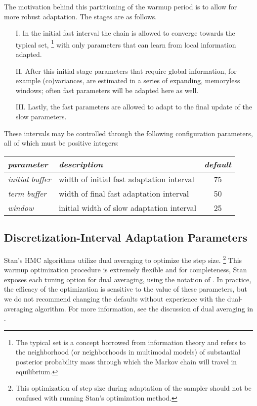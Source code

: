 The motivation behind this partitioning of the warmup period is to
allow for more robust adaptation.  The stages are as follows.

\begin{enumerate}
\item[I.]
In the initial fast interval the chain is allowed to converge
towards the typical set,%
%
\footnote{The typical set is a concept borrowed from information
  theory and refers to the neighborhood (or neighborhoods in
  multimodal models) of substantial posterior probability mass through
  which the Markov chain will travel in equilibrium.}
%
with only parameters that can learn from local information adapted.
\item[II.]
After this initial stage parameters that require global
information, for example (co)variances, are estimated in a series of
expanding, memoryless windows; often fast parameters will be adapted
here as well. 
\item[III.]
Lastly, the fast parameters are allowed to adapt to the
final update of the slow parameters.
\end{enumerate}

These intervals may be controlled through the following
configuration parameters, all of which must be positive integers:
%
\begin{center}
\begin{tabular}{l|lc}
{\it parameter} & {\it description} & {\it default} 
\\ \hline
{\it initial buffer} & width of initial fast adaptation interval
                     & 75
\\
{\it term buffer} & width of final fast adaptation interval
                  &  50
\\
{\it window}  & initial width of slow adaptation interval
              & 25
\end{tabular}
\end{center}

\subsection{Discretization-Interval Adaptation Parameters}

Stan's HMC algorithms utilize dual averaging \citep{Nesterov:2009} to
optimize the step size.%
%
\footnote{This optimization of step size during
adaptation of the sampler should not be confused with running Stan's
optimization method.}
%
This warmup optimization procedure is extremely flexible and for
completeness, Stan exposes each tuning option for dual averaging,
using the notation of \cite{Hoffman-Gelman:2014}. In practice, the
efficacy of the optimization is sensitive to the value of these
parameters, but we do not recommend changing the defaults without
experience with the dual-averaging algorithm. For more information,
see the discussion of dual averaging in \citep{Hoffman-Gelman:2011,
 Hoffman-Gelman:2014}.


